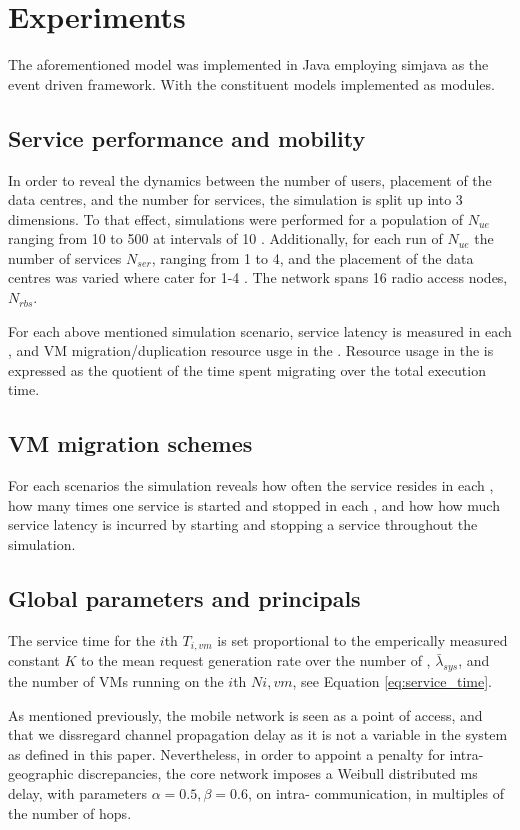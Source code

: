 \section{Experiments}
The aforementioned model was implemented in Java employing simjava \cite{SimJava} as the event driven framework. With the constituent models implemented as modules.

\subsection{Service performance and mobility}

In order to reveal the dynamics between the number of users, placement of the data centres, and the number for services, the simulation is split up into 3 dimensions. To that effect, simulations were performed for a population of \ues{} $N_{ue}$ ranging from 10 to 500 \ues{} at intervals of 10 \ues{}. Additionally, for each run of $N_{ue}$ the number of services $N_{ser}$, ranging from 1 to 4, and the placement of the data centres was varied where \dcs{} cater for 1-4 \rbss{}. The network spans 16 radio access nodes, $N_{rbs}$.

For each above mentioned simulation scenario, service latency is measured in each \ue{}, and VM migration/duplication resource usge in the \dcs{}. Resource usage in the \dcs{} is expressed as the quotient of the time spent migrating over the total execution time.

\subsection{VM migration schemes}
For each scenarios the simulation reveals how often the service resides in each \dc{}, how many times one service is started and stopped in each \dc{}, and how how much service latency is incurred by starting and stopping a service throughout the simulation.

\subsection{Global parameters and principals}
The \dc{} service time for the \(i\)th \dc{} $T_{i,vm}$ is set proportional to the emperically measured constant $K$ to the mean request generation rate over the number of \rbss{}, $\bar{\lambda}_{sys}$, and the number of VMs running on the \(i\)th \dc{} $N{i,vm}$, see Equation \ref{eq:service_time}.

As mentioned previously, the mobile network is seen as a point of access, and that we dissregard channel propagation delay as it is not a variable in the \xcloud system as defined in this paper. Nevertheless, in order to appoint a penalty for intra-\dc{} geographic discrepancies, the core network imposes a Weibull distributed ms delay, with parameters $\alpha=0.5, \beta=0.6$, on intra-\dc{} communication, in multiples of the number of hops.

